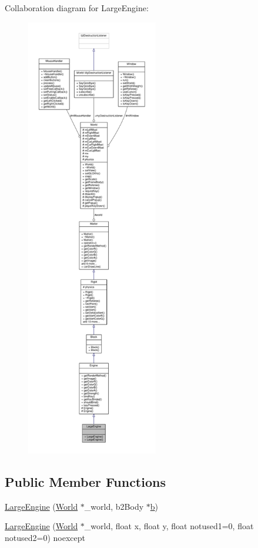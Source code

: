 Collaboration diagram for Large\+Engine\+:\nopagebreak
\begin{figure}[H]
\begin{center}
\leavevmode
\includegraphics[height=550pt]{classLargeEngine__coll__graph}
\end{center}
\end{figure}
\subsection*{Public Member Functions}
\begin{DoxyCompactItemize}
\item 
\hyperlink{classLargeEngine_a756c59d574466007d596649bd3fe5504}{Large\+Engine} (\hyperlink{classWorld}{World} $\ast$\+\_\+world, b2\+Body $\ast$\hyperlink{image_8h_ab2d05693952610f937e5acb3c4a8fa1b}{b})
\item 
\hyperlink{classLargeEngine_a02b3d03941f0d1a554f0ce7e22938fd6}{Large\+Engine} (\hyperlink{classWorld}{World} $\ast$\+\_\+world, float x, float y, float notused1=0, float notused2=0) noexcept
\end{DoxyCompactItemize}
